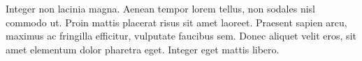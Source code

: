\lipsum[20]

	
	\begin{quadro}[h!]	
		\centering
	\end{quadro}

\lipsum[21]

Integer non lacinia magna. Aenean tempor lorem tellus, non sodales nisl commodo ut. Proin mattis placerat risus sit amet laoreet. Praesent sapien arcu, maximus ac fringilla efficitur, vulputate faucibus sem. Donec aliquet velit eros, sit amet elementum dolor pharetra eget. Integer eget mattis libero.

